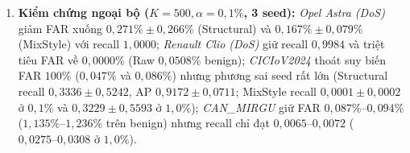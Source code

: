 \documentclass[12pt, a4paper, reqno, oneside]{book}
\begin{document}
\begin{enumerate}
    \item \textbf{Kiểm chứng ngoại bộ ($K=500, \alpha=0{,}1\%$, 3 seed):} \textit{Opel Astra (DoS)} giảm FAR xuống $0{,}271\% \pm 0{,}266\%$ (Structural) và $0{,}167\% \pm 0{,}079\%$ (MixStyle) với recall $1{,}0000$; \textit{Renault Clio (DoS)} giữ recall $0{,}9984$ và triệt tiêu FAR về $0{,}0000\%$ (Raw $0{,}0508\%$ benign); \textit{CICIoV2024} thoát suy biến FAR $100\%$ ($0{,}047\%$ và $0{,}086\%$) nhưng phương sai seed rất lớn (Structural recall $0{,}3336 \pm 0{,}5242$, AP $0{,}9172 \pm 0{,}0711$; MixStyle recall $0{,}0001 \pm 0{,}0002$ ở $0{,}1\%$ và $0{,}3229 \pm 0{,}5593$ ở $1{,}0\%$); \textit{CAN\_MIRGU} giữ FAR $0{,}087\%\text{--}0{,}094\%$ ($1{,}135\%\text{--}1{,}236\%$ trên benign) nhưng recall chỉ đạt $0{,}0065\text{--}0{,}0072$ ($0{,}0275\text{--}0{,}0308$ ở $1{,}0\%$).
\end{enumerate}
\end{document}

